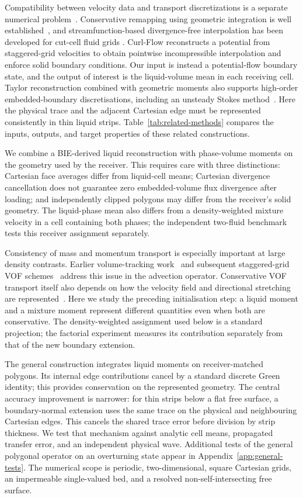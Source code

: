 \documentclass[10pt]{article}
\begin{document}
Compatibility between velocity data and transport discretizations is a
separate numerical problem~\citep{sun}. Conservative remapping using geometric
integration is well established~\citep{ullrich}, and streamfunction-based
divergence-free interpolation has been developed for cut-cell fluid grids
\citep{chang,curlflow}. Curl-Flow reconstructs a potential from staggered-grid
velocities to obtain pointwise incompressible interpolation and enforce solid
boundary conditions. Our input is instead a potential-flow boundary state,
and the output of interest is the liquid-volume mean in each receiving cell.
Taylor reconstruction combined with geometric moments also
supports high-order embedded-boundary discretisations, including an unsteady
Stokes method~\citep{overton}. Here the physical trace and the adjacent
Cartesian edge must be represented consistently in thin liquid strips.
Table~\ref{tab:related-methods} compares the inputs, outputs, and target
properties of these related constructions.

We combine a BIE-derived liquid reconstruction with phase-volume moments
on the geometry used by the receiver. This requires care with three
distinctions: Cartesian face averages differ from liquid-cell means;
Cartesian divergence cancellation does not guarantee zero embedded-volume
flux divergence after loading; and independently clipped polygons may differ
from the receiver's solid geometry.
The liquid-phase mean also differs from a density-weighted mixture
velocity in a cell containing both phases; the independent two-fluid
benchmark tests this receiver assignment separately.

Consistency of mass and momentum transport is especially important at large
density contrasts. Earlier volume-tracking work~\citep{rudman} and subsequent
staggered-grid VOF schemes~\citep{arrufat} address this issue in the advection
operator. Conservative VOF transport itself also depends on how the velocity
field and directional stretching are represented~\citep{weymouth}. Here we
study the preceding initialisation step: a liquid moment and a mixture
moment represent different quantities even when both are conservative.
The density-weighted assignment used below is a standard projection; the
factorial experiment measures its contribution separately from that of
the new boundary extension.

The general construction integrates liquid moments on receiver-matched
polygons. Its internal edge contributions cancel by a standard discrete
Green identity; this provides conservation on the represented geometry.
The central accuracy improvement is narrower: for thin strips below a flat
free surface, a boundary-normal extension uses the same trace on the
physical and neighbouring Cartesian edges. This cancels the shared trace
error before division by strip thickness. We test that mechanism against
analytic cell means, propagated transfer error, and an independent physical
wave. Additional tests of the general polygonal operator on an overturning
state appear in Appendix~\ref{app:general-tests}.
The numerical scope is periodic, two-dimensional, square Cartesian grids,
an impermeable single-valued bed, and a resolved non-self-intersecting free
surface.
\end{document}
